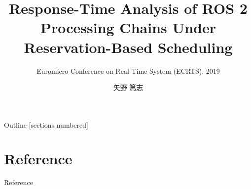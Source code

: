 \newcommand{\beamerDir}[0]{/mnt/c/Users/atsushi/Documents/workspace/env/Beamer/beamer/beamer/}





\newcommand{\forme}[1]{}


\title{Response-Time Analysis of ROS 2 Processing Chains Under Reservation-Based Scheduling}
\subtitle{Euromicro Conference on Real-Time System (ECRTS), 2019}
\author{矢野 篤志}




\maketitle



\begin{frame}{Outline}
    [sections numbered]
    \scriptsize\tableofcontents[hideallsubsections]
\end{frame}

% 
% 
% 


% 
% 
% 

\lastpage

\section*{Reference}
\begin{frame}[allowframebreaks]{Reference}
    \beamertemplatetextbibitems
    
    
\end{frame}


